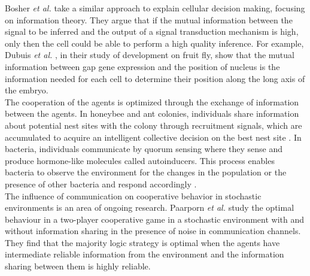 Bosher \textit{et al.} \cite{Bowsher2014} take a similar approach to explain cellular decision making, focusing on information theory. They argue that if the mutual information between the signal to be inferred and the output of a signal transduction mechanism is high, only then the cell could be able to perform a high quality inference. For example, Dubuis \textit{et al.} \cite{dubuis2013}, in their study of development on fruit fly, show that the mutual information between gap gene expression and the position of nucleus is the information needed for each cell to determine their position along the long axis of the embryo. \\
The cooperation of the agents is optimized through the exchange of information between the agents. In honeybee and ant colonies, individuals share information about potential nest sites with the colony through recruitment signals, which are accumulated to acquire an intelligent collective decision on the best nest site \cite{Franks2002}. In bacteria, individuals communicate by quorum sensing where they sense and produce hormone-like molecules called autoinducers. This process enables bacteria to observe the environment for the changes in the population or the presence of other bacteria and respond accordingly \cite{waters2005quorum}.\\
The influence of communication on cooperative behavior in stochastic environments is an area of ongoing research. Paarporn \textit{et al.} \cite{Paarporn2018a} study the optimal behaviour in a two-player cooperative game in a stochastic environment with and without information sharing in the presence of noise in communication channels. They find that the majority logic strategy is optimal when the agents have intermediate reliable information from the environment and the information sharing between them is highly reliable.

